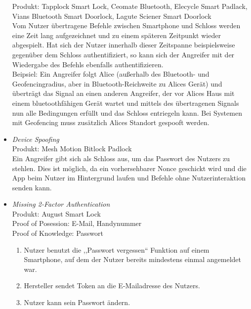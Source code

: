 \begin{itemize}[leftmargin=0cm,label={}]
                Produkt: Tapplock Smart Lock, Ceomate Bluetooth, Elecycle Smart Padlack, Vians Bluetooth Smart Doorlock, Lagute Sciener Smart Doorlock\\
                Vom Nutzer übertragene Befehle zwischen Smartphone und Schloss werden eine Zeit lang aufgezeichnet und zu einem späteren Zeitpunkt wieder abgespielt. 
                Hat sich der Nutzer innerhalb dieser Zeitspanne beispielsweise gegenüber dem Schloss authentifiziert, so kann sich der Angreifer mit der Wiedergabe des Befehls ebenfalls authentifizieren.\\ 
                Beipsiel: Ein Angreifer folgt Alice (außerhalb des Bluetooth- und Geofencingradius, aber in Bluetooth-Reichweite zu Alices Gerät) und überträgt das Signal an einen anderen Angreifer, der vor Alices Haus mit einem bluetoothfähigen Gerät wartet und mittels des übertragenen Signals nun alle Bedingungen erfüllt und das Schloss entriegeln kann.
                Bei Systemen mit Geofencing muss zusätzlich Alices Standort gespooft werden.
            \item \emph{Device Spoofing}\cite{Rose2016}\label{vuln:spoofing}\\
                Produkt: Mesh Motion Bitlock Padlock\\
                Ein Angreifer gibt sich als Schloss aus, um das Passwort des Nutzers zu stehlen. 
                Dies ist möglich, da ein vorhersehbarer Nonce geschickt wird und die App beim Nutzer im Hintergrund laufen und Befehle ohne Nutzerinteraktion senden kann.
	        \item \emph{Missing 2-Factor Authentication}\cite{Jmaxxz2015}\label{vuln:2factor}\\
                Produkt: August Smart Lock\\
                Proof of Posession: E-Mail, Handynummer\\
                Proof of Knowledge: Passwort\\
                \begin{enumerate}[noitemsep]
                    \item Nutzer benutzt die ,,Passwort vergessen`` Funktion auf einem Smartphone, auf dem der Nutzer bereits mindestens einmal angemeldet war.
                    \item Hersteller sendet Token an die E-Mailadresse des Nutzers.
                    \item Nutzer kann sein Passwort ändern.
                \end{enumerate}

\end{itemize}

